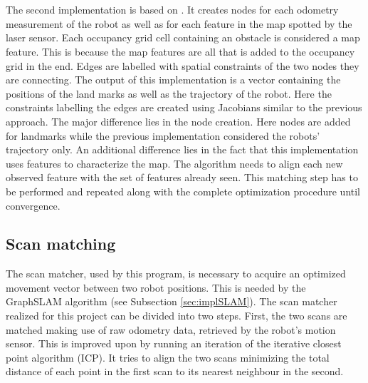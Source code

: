 \documentclass{ba-kecs}
\begin{document}
\\
\\
The second implementation is based on \cite{Thrun}. It creates nodes for each odometry measurement of the robot as well as for each feature in the map spotted by the laser sensor. Each occupancy grid cell containing an obstacle is considered a map feature. This is because the map features are all that is added to the occupancy grid in the end. Edges are labelled with spatial constraints of the two nodes they are connecting. The output of this implementation is a vector containing the positions of the land marks as well as the trajectory of the robot. Here the constraints labelling the edges are created using Jacobians similar to the previous approach. The major difference lies in the node creation. Here nodes are added for landmarks while the previous implementation considered the robots' trajectory only. An additional difference lies in the fact that this implementation uses features to characterize the map. The algorithm needs to align each new observed feature with the set of features already seen. This matching step has to be performed and repeated along with the complete optimization procedure until convergence.

\subsection{Scan matching}
\label{sec:scan}
The scan matcher, used by this program, is necessary to acquire an optimized movement vector between two robot positions. This is needed by the GraphSLAM algorithm (see Subsection \ref{sec:implSLAM}). The scan matcher realized for this project can be divided into two steps. First, the two scans are matched making use of raw odometry data, retrieved by the robot's motion sensor. This is improved upon by running an iteration of the iterative closest point algorithm (ICP). It tries to align the two scans minimizing the total distance of each point in the first scan to its nearest neighbour in the second. 
\end{document}
